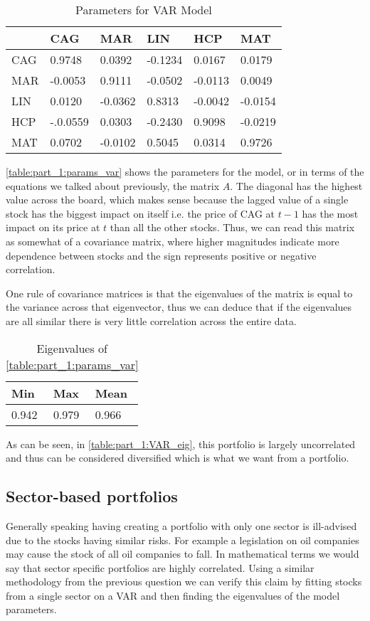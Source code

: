 \begin{table}[]
    \centering
    \begin{tabular}{l|lllll}
        & CAG      & MAR     & LIN     & HCP     & MAT     \\ \hline
    CAG & 0.9748   & 0.0392  & -0.1234 & 0.0167  & 0.0179  \\ 
    MAR & -0.0053  & 0.9111  & -0.0502 & -0.0113 & 0.0049  \\ 
    LIN & 0.0120   & -0.0362 & 0.8313  & -0.0042 & -0.0154 \\ 
    HCP & -.0.0559 & 0.0303  & -0.2430 & 0.9098  & -0.0219 \\ 
    MAT & 0.0702   & -0.0102 & 0.5045  & 0.0314  & 0.9726 
    \end{tabular}
    \caption{Parameters for VAR Model}
    \label{table:part_1:params_var}
\end{table}

\autoref{table:part_1:params_var} shows the parameters for the model, or in terms of the equations we talked about previously, the matrix $A$. The diagonal has the highest value across the board, which makes sense because the lagged value of a single stock has the biggest impact on itself i.e. the price of CAG at $t-1$ has the most impact on its price at $t$ than all the other stocks. Thus, we can read this matrix as somewhat of a covariance matrix, where higher magnitudes indicate more dependence between stocks and the sign represents positive or negative correlation.

One rule of covariance matrices is that the eigenvalues of the matrix is equal to the variance across that eigenvector, thus we can deduce that if the eigenvalues are all similar there is very little correlation across the entire data.
  

\begin{table}[]
    \centering
    \begin{tabular}{l|l|l}
    Min      & Max     & Mean     \\ \hline
    0.942   & 0.979  & 0.966
    \end{tabular}
    \caption{Eigenvalues of \autoref{table:part_1:params_var}}
    \label{table:part_1:VAR_eig}
\end{table}

As can be seen, in \autoref{table:part_1:VAR_eig}, this portfolio is largely uncorrelated and thus can be considered diversified which is what we want from a portfolio.

\subsection{Sector-based portfolios}
Generally speaking having creating a portfolio with only one sector is ill-advised due to the stocks having similar risks. For example a legislation on oil companies may cause the stock of all oil companies to fall. In mathematical terms we would say that sector specific portfolios are highly correlated. Using a similar methodology from the previous question we can verify this claim by fitting stocks from a single sector on a VAR and then finding the eigenvalues of the model parameters.

